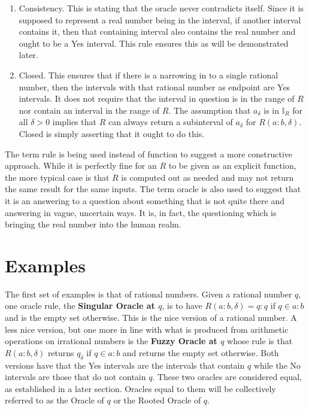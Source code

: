 \documentclass[12pt]{article}
\begin{document}
\begin{enumerate}
    \item Consistency. This is stating that the oracle never contradicts itself. Since it is supposed to represent a real number being in the interval, if another interval contains it, then that containing interval also contains the real number and ought to be a Yes interval. This rule ensures this as will be demonstrated later. 
    
    \item Closed. This ensures that if there is a narrowing in to a single rational number, then the intervals with that rational number as endpoint are Yes intervals. It does not require that the interval in question is in the range of $R$ nor contain an interval in the range of $R$. The assumption that $a_\delta$ is in $\mathbb{I}_R$ for all $\delta >0$ implies that $R$ can always return a subinterval of $a_\delta$ for $R(a:b, \delta)$. Closed is simply asserting that it ought to do this. 

\end{enumerate}

The term rule is being used instead of function to suggest a more constructive approach. While it is perfectly fine for an $R$ to be given as an explicit function, the more typical case is that $R$ is computed out as needed and may not return the same result for the same inputs. The term oracle is also used to suggest that it is an answering to a question about something that is not quite there and answering in vague, uncertain ways. It is, in fact, the questioning which is bringing the real number into the human realm.


\section{Examples}

The first set of examples is that of rational numbers. Given a rational number $q$, one oracle rule, the \textbf{Singular Oracle at $q$}, is to have  $R(a:b, \delta) = q:q$ if $q \in a:b$ and is the empty set otherwise. This is the nice version of a rational number. A less nice version, but one more in line with what is produced from arithmetic operations on irrational numbers is the \textbf{Fuzzy Oracle at $q$} whose rule is that $R(a:b, \delta)$ returns $q_\delta$ if $q \in a:b$ and returns the empty set otherwise. Both versions have that the Yes intervals are the intervals that contain $q$ while the No intervals are those that do not contain $q$. These two oracles are considered equal, as established in a later section. Oracles equal to them will be collectively referred to as the Oracle of $q$ or the Rooted Oracle of $q$.  
\end{document}
